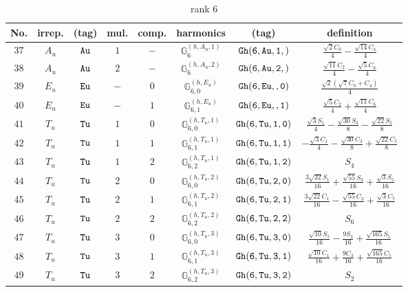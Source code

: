 \documentclass[fleqn,8pt]{jsarticle}
\begin{document}
\begin{table}[ht!]
\begin{center}
\caption{rank 6}
\renewcommand{\arraystretch}{1.3}
\begin{tabular}{cccccccc} \hline \hline
No. & irrep. & (tag) & mul. & comp. & harmonics & (tag) & definition \\ \hline
$ 37 $ & $ A_{u} $ & $ {\tt Au} $ & $ 1 $ & $ - $ & $ \mathbb{G}_{6}^{(h,A_{u},1)} $ & $ {\tt Gh(6,Au,1,)} $ & $ \frac{\sqrt{2} C_{0}}{4} - \frac{\sqrt{14} C_{4}}{4} $ \\
$ 38 $ & $ A_{u} $ & $ {\tt Au} $ & $ 2 $ & $ - $ & $ \mathbb{G}_{6}^{(h,A_{u},2)} $ & $ {\tt Gh(6,Au,2,)} $ & $ \frac{\sqrt{11} C_{2}}{4} - \frac{\sqrt{5} C_{6}}{4} $ \\
$ 39 $ & $ E_{u} $ & $ {\tt Eu} $ & $ - $ & $ 0 $ & $ \mathbb{G}_{6,0}^{(h,E_{u})} $ & $ {\tt Gh(6,Eu,,0)} $ & $ \frac{\sqrt{2} \left(\sqrt{7} C_{0} + C_{4}\right)}{4} $ \\
$ 40 $ & $ E_{u} $ & $ {\tt Eu} $ & $ - $ & $ 1 $ & $ \mathbb{G}_{6,1}^{(h,E_{u})} $ & $ {\tt Gh(6,Eu,,1)} $ & $ \frac{\sqrt{5} C_{2}}{4} + \frac{\sqrt{11} C_{6}}{4} $ \\
$ 41 $ & $ T_{u} $ & $ {\tt Tu} $ & $ 1 $ & $ 0 $ & $ \mathbb{G}_{6,0}^{(h,T_{u},1)} $ & $ {\tt Gh(6,Tu,1,0)} $ & $ \frac{\sqrt{3} S_{1}}{4} - \frac{\sqrt{30} S_{3}}{8} - \frac{\sqrt{22} S_{5}}{8} $ \\
$ 42 $ & $ T_{u} $ & $ {\tt Tu} $ & $ 1 $ & $ 1 $ & $ \mathbb{G}_{6,1}^{(h,T_{u},1)} $ & $ {\tt Gh(6,Tu,1,1)} $ & $ - \frac{\sqrt{3} C_{1}}{4} - \frac{\sqrt{30} C_{3}}{8} + \frac{\sqrt{22} C_{5}}{8} $ \\
$ 43 $ & $ T_{u} $ & $ {\tt Tu} $ & $ 1 $ & $ 2 $ & $ \mathbb{G}_{6,2}^{(h,T_{u},1)} $ & $ {\tt Gh(6,Tu,1,2)} $ & $ S_{4} $ \\
$ 44 $ & $ T_{u} $ & $ {\tt Tu} $ & $ 2 $ & $ 0 $ & $ \mathbb{G}_{6,0}^{(h,T_{u},2)} $ & $ {\tt Gh(6,Tu,2,0)} $ & $ \frac{3 \sqrt{22} S_{1}}{16} + \frac{\sqrt{55} S_{3}}{16} + \frac{\sqrt{3} S_{5}}{16} $ \\
$ 45 $ & $ T_{u} $ & $ {\tt Tu} $ & $ 2 $ & $ 1 $ & $ \mathbb{G}_{6,1}^{(h,T_{u},2)} $ & $ {\tt Gh(6,Tu,2,1)} $ & $ \frac{3 \sqrt{22} C_{1}}{16} - \frac{\sqrt{55} C_{3}}{16} + \frac{\sqrt{3} C_{5}}{16} $ \\
$ 46 $ & $ T_{u} $ & $ {\tt Tu} $ & $ 2 $ & $ 2 $ & $ \mathbb{G}_{6,2}^{(h,T_{u},2)} $ & $ {\tt Gh(6,Tu,2,2)} $ & $ S_{6} $ \\
$ 47 $ & $ T_{u} $ & $ {\tt Tu} $ & $ 3 $ & $ 0 $ & $ \mathbb{G}_{6,0}^{(h,T_{u},3)} $ & $ {\tt Gh(6,Tu,3,0)} $ & $ \frac{\sqrt{10} S_{1}}{16} - \frac{9 S_{3}}{16} + \frac{\sqrt{165} S_{5}}{16} $ \\
$ 48 $ & $ T_{u} $ & $ {\tt Tu} $ & $ 3 $ & $ 1 $ & $ \mathbb{G}_{6,1}^{(h,T_{u},3)} $ & $ {\tt Gh(6,Tu,3,1)} $ & $ \frac{\sqrt{10} C_{1}}{16} + \frac{9 C_{3}}{16} + \frac{\sqrt{165} C_{5}}{16} $ \\
$ 49 $ & $ T_{u} $ & $ {\tt Tu} $ & $ 3 $ & $ 2 $ & $ \mathbb{G}_{6,2}^{(h,T_{u},3)} $ & $ {\tt Gh(6,Tu,3,2)} $ & $ S_{2} $ \\
 \hline \hline
\end{tabular}
\end{center}
\end{table}
\end{document}
